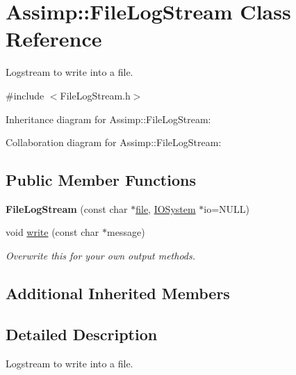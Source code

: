 \hypertarget{class_assimp_1_1_file_log_stream}{\section{Assimp\+:\+:File\+Log\+Stream Class Reference}
\label{class_assimp_1_1_file_log_stream}
}


Logstream to write into a file.  




{\ttfamily \#include $<$File\+Log\+Stream.\+h$>$}



Inheritance diagram for Assimp\+:\+:File\+Log\+Stream\+:


Collaboration diagram for Assimp\+:\+:File\+Log\+Stream\+:
\subsection*{Public Member Functions}
\begin{DoxyCompactItemize}
\item 
\hypertarget{class_assimp_1_1_file_log_stream_ae347432a2ade83f291607940edfd4c76}{{\bfseries File\+Log\+Stream} (const char $\ast$\hyperlink{structfile}{file}, \hyperlink{class_assimp_1_1_i_o_system}{I\+O\+System} $\ast$io=N\+U\+L\+L)}\label{class_assimp_1_1_file_log_stream_ae347432a2ade83f291607940edfd4c76}

\item 
void \hyperlink{class_assimp_1_1_file_log_stream_abeadc880a20fa886ac65608a8296ba29}{write} (const char $\ast$message)
\begin{DoxyCompactList}\small\item\em Overwrite this for your own output methods. \end{DoxyCompactList}\end{DoxyCompactItemize}
\subsection*{Additional Inherited Members}


\subsection{Detailed Description}
Logstream to write into a file. 

